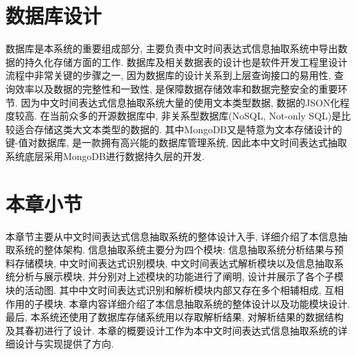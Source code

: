 \section{数据库设计}

数据库是本系统的重要组成部分, 主要负责中文时间表达式信息抽取系统中导出数据的持久化存储方面的工作.
数据库及相关数据表的设计也是软件开发工程里设计流程中非常关键的步骤之一, 因为数据库的设计关系到上层查询接口的易用性, 查询效率以及数据的完整性和一致性, 是保障数据存储效率和数据完整安全的重要环节.
因为中文时间表达式信息抽取系统大量的使用文本类型数据, 数据的JSON化程度较高. 在当前众多的开源数据库中, 非关系型数据库(NoSQL, Not-only SQL)是比较适合存储这类大文本类型的数据的.
其中MongoDB又是特意为文本存储设计的键-值对数据库, 是一款拥有高兴能的数据库管理系统, 因此本中文时间表达式抽取系统底层采用MongoDB进行数据持久层的开发.



\section{本章小节}

本章节主要从中文时间表达式信息抽取系统的整体设计入手, 详细介绍了本信息抽取系统的整体架构.
信息抽取系统主要分为四个模块: 信息抽取系统分析结果与预料存储模块, 中文时间表达式识别模块, 中文时间表达式解析模块以及信息抽取系统分析与展示模块, 并分别对上述模块的功能进行了阐明, 设计并展示了各个子模块的活动图.
其中中文时间表达式识别和解析模块内部又存在多个相辅相成, 互相作用的子模块. 本章内容详细介绍了本信息抽取系统的整体设计以及功能模块设计.
最后, 本系统还使用了数据库存储系统用以存取解析结果, 对解析结果的数据结构及其春初进行了设计. 本章的概要设计工作为本中文时间表达式信息抽取系统的详细设计与实现提供了方向.

